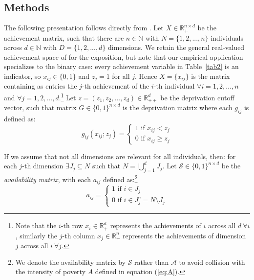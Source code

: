 \documentclass[11pt, a4paper]{article}
\begin{document}
\subsection{Methods}

The following presentation follows directly from \textcite[pp. 24-50]{alkire2015}. Let $X \in \mathbb{R}_+^{n\times d}$ be the achievement matrix, such that there are $n\in\mathbb{N} \text{ with } N=\{1,2,...,n\}$ individuals across $d \in \mathbb{N} \text{ with } D=\{1,2,...,d\}$ dimensions. We retain the general real-valued achievement space of \textcite{alkire2015} for the exposition, but note that our empirical application specializes to the binary case: every achievement variable in Table~\ref{tab2} is an indicator, so $x_{ij}\in\{0,1\}$ and $z_j=1$ for all $j$. Hence $X=\{x_{ij}\}$ is the matrix containing as entries the $j$-th achievement of the $i$-th individual $\forall i = 1,2,...,n$ and $\forall j = 1,2,...,d$.\footnote{Note that the $i$-th row $x_i \in \mathbb{R}_+^d$ represents the achievements of $i$ across all $d \ \forall i$, similarly the $j$-th column $x_j \in \mathbb{R}_+^n$ represents the achievements of dimension $j$ across all $i \ \forall j$.} Let $z=(z_1,z_2,...,z_d)\in \mathbb{R}_{++}^d$ be the deprivation cutoff vector, such that matrix $G \in \{0,1\}^{n\times d}$ is the deprivation matrix where each $g_{ij}$ is defined as: \begin{equation}
    g_{ij}(x_{ij};z_j)=\begin{cases}
        1 \text{ if } x_{ij} < z_j \\
        0 \text{ if } x_{ij} \geq z_j
    \end{cases}
    \label{eq:deprivation}
\end{equation}

If we assume that not all dimensions are relevant for all individuals, then: for each $j$-th dimension $\exists J_j\subseteq N$ such that $N=\bigcup_{j=1}^dJ_j$. Let $\mathcal{S} \in \{0,1\}^{n\times d}$ be the \textit{availability matrix}, with each $a_{ij}$ defined as:\footnote{We denote the availability matrix by $\mathcal{S}$ rather than $\mathcal{A}$ to avoid collision with the intensity of poverty $A$ defined in equation (\ref{eq:A}).} \begin{equation}
    a_{ij}=\begin{cases}
        1 \text{ if } i \in J_j \\
        0 \text{ if } i \in J_j^c = N \setminus J_j
    \end{cases}
    \label{eq:availability}
\end{equation}
\end{document}
